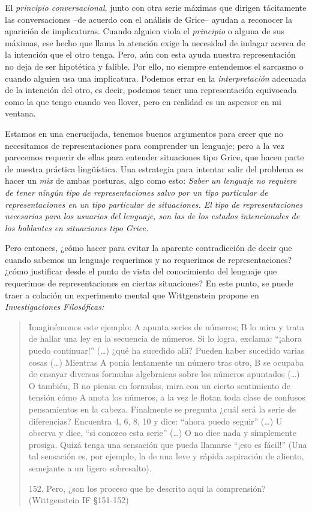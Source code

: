 \documentclass[]{book}
\begin{document}
El \emph{principio conversacional}, junto con otra serie máximas que
dirigen tácitamente las conversaciones --de acuerdo con el análisis de
Grice-- ayudan a reconocer la aparición de implicaturas. Cuando alguien
viola el \emph{principio} o alguna de sus máximas, ese hecho que llama
la atención exige la necesidad de indagar acerca de la intención que el
otro tenga. Pero, aún con esta ayuda nuestra representación no deja de
ser hipotética y falible. Por ello, no siempre entendemos el sarcasmo o
cuando alguien usa una implicatura. Podemos errar en la
\emph{interpretación} adecuada de la intención del otro, es decir,
podemos tener una representación equivocada como la que tengo cuando veo
llover, pero en realidad es un aspersor en mi ventana.

Estamos en una encrucijada, tenemos buenos argumentos para creer que no
necesitamos de representaciones para comprender un lenguaje; pero a la
vez parecemos requerir de ellas para entender situaciones tipo Grice,
que hacen parte de nuestra práctica lingüística. Una estrategia para
intentar salir del problema es hacer un \emph{mix} de ambas posturas,
algo como esto: \emph{Saber un lenguaje no requiere de tener ningún tipo
de representaciones salvo por un tipo particular de representaciones en
un tipo particular de situaciones. El tipo de representaciones
necesarias para los usuarios del lenguaje, son las de los estados
intencionales de los hablantes en situaciones tipo Grice.}

Pero entonces, ¿cómo hacer para evitar la aparente contradicción de
decir que cuando sabemos un lenguaje requerimos y no requerimos de
representaciones? ¿cómo justificar desde el punto de vista del
conocimiento del lenguaje que requerimos de representaciones en ciertas
situaciones? En este punto, se puede traer a colación un experimento
mental que Wittgenstein propone en \emph{Investigaciones Filosóficas: }

\begin{quote}
Imaginémonos este ejemplo: A apunta series de números; B lo mira y trata
de hallar una ley en la secuencia de números. Si lo logra, exclama:
``¡ahora puedo continuar!'' (\ldots{}) ¿qué ha sucedido allí? Pueden
haber sucedido varias cosas (\ldots{}) Mientras A ponía lentamente un
número tras otro, B se ocupaba de ensayar diversas formulas algebraicas
sobre los números apuntados (\ldots{}) O también, B no piensa en
formulas, mira con un cierto sentimiento de tensión cómo A anota los
números, a la vez le flotan toda clase de confusos pensamientos en la
cabeza. Finalmente se pregunta ¿cuál será la serie de diferencias?
Encuentra 4, 6, 8, 10 y dice: ``ahora puedo seguir'' (\ldots{}) U
observa y dice, ``si conozco esta serie'' (\ldots{}) O no dice nada y
simplemente prosiga. Quizá tenga una sensación que pueda llamarse ``¡eso
es fácil!'' (Una tal sensación es, por ejemplo, la de una leve y rápida
aspiración de aliento, semejante a un ligero sobresalto).

152. Pero, ¿son los proceso que he descrito aquí la comprensión?
(Wittgenstein IF §151-152)
\end{quote}
\end{document}
